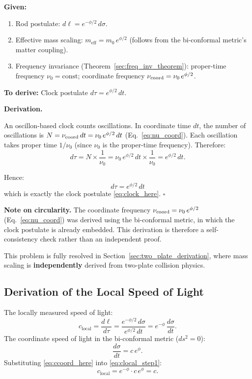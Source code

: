 \documentclass[11pt]{article}
\begin{document}
\textbf{Given:}
\begin{enumerate}
  \item Rod postulate: $d\ell = e^{-\phi/2}\,d\sigma$.
  \item Effective mass scaling:
    $m_{\mathrm{eff}} = m_0\,e^{\phi/2}$
    (follows from the bi-conformal metric's matter coupling).
  \item Frequency invariance
    (Theorem~\ref{sec:freq_inv_theorem}): proper-time
    frequency $\nu_0 = \mathrm{const}$; coordinate
    frequency $\nu_{\rm coord} = \nu_0\,e^{\phi/2}$.
\end{enumerate}

\textbf{To derive:} Clock postulate
$d\tau = e^{\phi/2}\,dt$.

\medskip
\textbf{Derivation.}

An oscillon-based clock counts oscillations.  In coordinate
time $dt$, the number of oscillations is
$N = \nu_{\rm coord}\,dt = \nu_0\,e^{\phi/2}\,dt$
(Eq.~\ref{eq:nu_coord}).  Each oscillation takes proper time
$1/\nu_0$ (since $\nu_0$ is the proper-time frequency).
Therefore:
\begin{equation}
  d\tau = N \times \frac{1}{\nu_0}
  = \nu_0\,e^{\phi/2}\,dt \times \frac{1}{\nu_0}
  = e^{\phi/2}\,dt.
  \label{eq:clock_derived}
\end{equation}

Hence:
\begin{equation}
  \boxed{d\tau = e^{\phi/2}\,dt}
  \label{eq:clock_from_freq}
\end{equation}
which is exactly the clock postulate \eqref{eq:clock_here}.
$\square$

\medskip
\textbf{Note on circularity.}
The coordinate frequency $\nu_{\rm coord} = \nu_0\,e^{\phi/2}$
(Eq.~\ref{eq:nu_coord}) was derived using the bi-conformal metric,
in which the clock postulate is already embedded.  This derivation
is therefore a self-consistency check rather than an independent
proof.

This problem is fully resolved in
Section~\ref{sec:two_plate_derivation}, where mass scaling is
\textbf{independently} derived from two-plate collision physics.

\subsection{Derivation of the Local Speed of Light}

The locally measured speed of light:
\begin{equation}
  c_{\mathrm{local}}
  = \frac{d\ell}{d\tau}
  = \frac{e^{-\phi/2}\,d\sigma}{e^{\phi/2}\,dt}
  = e^{-\phi}\,\frac{d\sigma}{dt}.
  \label{eq:clocal_step1}
\end{equation}
The coordinate speed of light in the bi-conformal metric
($ds^2 = 0$):
\begin{equation}
  \frac{d\sigma}{dt} = c\,e^{\phi}.
  \label{eq:ccoord_here}
\end{equation}
Substituting \eqref{eq:ccoord_here} into
\eqref{eq:clocal_step1}:
\begin{equation}
  c_{\mathrm{local}} = e^{-\phi}\cdot c\,e^{\phi} = c.
  \label{eq:clocal_result}
\end{equation}
\end{document}
